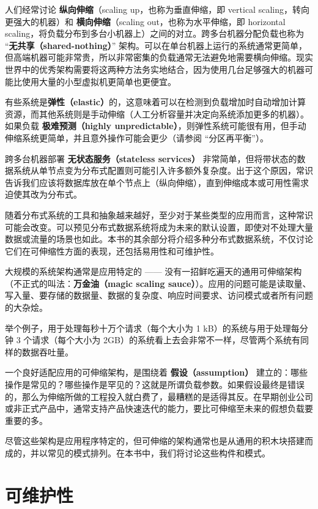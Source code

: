 人们经常讨论 \textbf{纵向伸缩}（scaling up，也称为垂直伸缩，即 vertical scaling，转向更强大的机器）和 \textbf{横向伸缩}（scaling out，也称为水平伸缩，即 horizontal scaling，将负载分布到多台小机器上）之间的对立。跨多台机器分配负载也称为 “\textbf{无共享（shared-nothing）}” 架构。可以在单台机器上运行的系统通常更简单，但高端机器可能非常贵，所以非常密集的负载通常无法避免地需要横向伸缩。现实世界中的优秀架构需要将这两种方法务实地结合，因为使用几台足够强大的机器可能比使用大量的小型虚拟机更简单也更便宜。

有些系统是\textbf{弹性（elastic）}的，这意味着可以在检测到负载增加时自动增加计算资源，而其他系统则是手动伸缩（人工分析容量并决定向系统添加更多的机器）。如果负载 \textbf{极难预测（highly unpredictable）}，则弹性系统可能很有用，但手动伸缩系统更简单，并且意外操作可能会更少（请参阅 “分区再平衡”）。

跨多台机器部署 \textbf{无状态服务（stateless services）} 非常简单，但将带状态的数据系统从单节点变为分布式配置则可能引入许多额外复杂度。出于这个原因，常识告诉我们应该将数据库放在单个节点上（纵向伸缩），直到伸缩成本或可用性需求迫使其改为分布式。

随着分布式系统的工具和抽象越来越好，至少对于某些类型的应用而言，这种常识可能会改变。可以预见分布式数据系统将成为未来的默认设置，即使对不处理大量数据或流量的场景也如此。本书的其余部分将介绍多种分布式数据系统，不仅讨论它们在可伸缩性方面的表现，还包括易用性和可维护性。

大规模的系统架构通常是应用特定的 —— 没有一招鲜吃遍天的通用可伸缩架构（不正式的叫法：\textbf{万金油（magic scaling sauce）}）。应用的问题可能是读取量、写入量、要存储的数据量、数据的复杂度、响应时间要求、访问模式或者所有问题的大杂烩。

举个例子，用于处理每秒十万个请求（每个大小为 1 kB）的系统与用于处理每分钟 3 个请求（每个大小为 2GB）的系统看上去会非常不一样，尽管两个系统有同样的数据吞吐量。

一个良好适配应用的可伸缩架构，是围绕着 \textbf{假设（assumption）} 建立的：哪些操作是常见的？哪些操作是罕见的？这就是所谓负载参数。如果假设最终是错误的，那么为伸缩所做的工程投入就白费了，最糟糕的是适得其反。在早期创业公司或非正式产品中，通常支持产品快速迭代的能力，要比可伸缩至未来的假想负载要重要的多。

尽管这些架构是应用程序特定的，但可伸缩的架构通常也是从通用的积木块搭建而成的，并以常见的模式排列。在本书中，我们将讨论这些构件和模式。

\section{可维护性}

